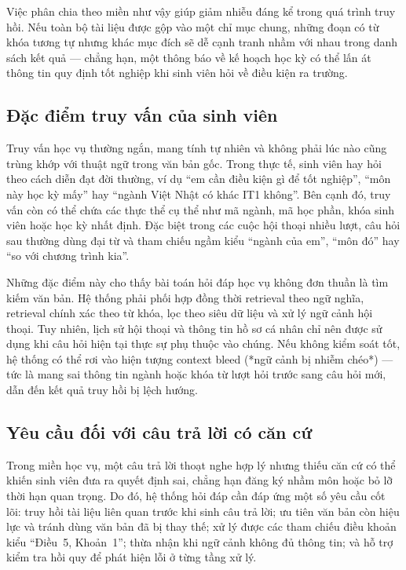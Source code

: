 \documentclass[../DoAn.tex]{subfiles}
\begin{document}
Việc phân chia theo miền như vậy giúp giảm nhiễu đáng kể trong quá trình truy
hồi. Nếu toàn bộ tài liệu được gộp vào một chỉ mục chung, những đoạn có từ
khóa tương tự nhưng khác mục đích sẽ dễ cạnh tranh nhầm với nhau trong danh
sách kết quả --- chẳng hạn, một thông báo về kế hoạch học kỳ có thể lấn át
thông tin quy định tốt nghiệp khi sinh viên hỏi về điều kiện ra trường.

\subsection{Đặc điểm truy vấn của sinh viên}

Truy vấn học vụ thường ngắn, mang tính tự nhiên và không phải lúc nào cũng
trùng khớp với thuật ngữ trong văn bản gốc. Trong thực tế, sinh viên hay hỏi
theo cách diễn đạt đời thường, ví dụ ``em cần điều kiện gì để tốt nghiệp'',
``môn này học kỳ mấy'' hay ``ngành Việt Nhật có khác IT1 không''. Bên cạnh đó,
truy vấn còn có thể chứa các thực thể cụ thể như mã ngành, mã học phần, khóa
sinh viên hoặc học kỳ nhất định. Đặc biệt trong các cuộc hội thoại nhiều lượt,
câu hỏi sau thường dùng đại từ và tham chiếu ngầm kiểu ``ngành của em'', ``môn
đó'' hay ``so với chương trình kia''.

Những đặc điểm này cho thấy bài toán hỏi đáp học vụ không đơn thuần là tìm
kiếm văn bản. Hệ thống phải phối hợp đồng thời retrieval theo ngữ nghĩa,
retrieval chính xác theo từ khóa, lọc theo siêu dữ liệu và xử lý ngữ cảnh hội
thoại. Tuy nhiên, lịch sử hội thoại và thông tin hồ sơ cá nhân chỉ nên được
sử dụng khi câu hỏi hiện tại thực sự phụ thuộc vào chúng. Nếu không kiểm soát
tốt, hệ thống có thể rơi vào hiện tượng context bleed (*ngữ cảnh bị nhiễm
chéo*) --- tức là mang sai thông tin ngành hoặc khóa từ lượt hỏi trước sang
câu hỏi mới, dẫn đến kết quả truy hồi bị lệch hướng.

\subsection{Yêu cầu đối với câu trả lời có căn cứ}

Trong miền học vụ, một câu trả lời thoạt nghe hợp lý nhưng thiếu căn cứ có
thể khiến sinh viên đưa ra quyết định sai, chẳng hạn đăng ký nhầm môn hoặc
bỏ lỡ thời hạn quan trọng. Do đó, hệ thống hỏi đáp cần đáp ứng một số yêu
cầu cốt lõi: truy hồi tài liệu liên quan trước khi sinh câu trả lời; ưu tiên
văn bản còn hiệu lực và tránh dùng văn bản đã bị thay thế; xử lý được các
tham chiếu điều khoản kiểu ``Điều~5, Khoản~1''; thừa nhận khi ngữ cảnh không
đủ thông tin; và hỗ trợ kiểm tra hồi quy để phát hiện lỗi ở từng tầng xử lý.
\end{document}
